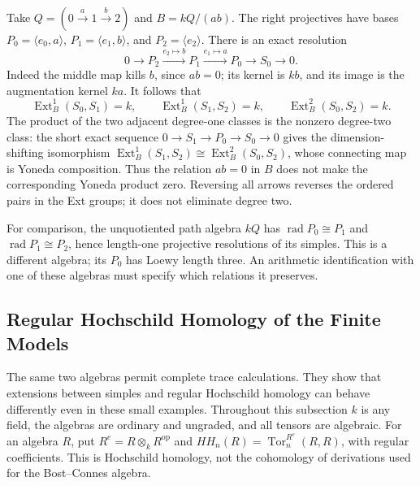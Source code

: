 \begin{example}
\label{v4-arith:wild:three-vertex}
Take \(Q=(0\xrightarrow{a}1\xrightarrow{b}2)\) and \(B=kQ/(ab)\).
The right projectives have bases
\(P_0=\langle e_0,a\rangle\), \(P_1=\langle e_1,b\rangle\),
and \(P_2=\langle e_2\rangle\). There is an exact resolution
\[
 0\longrightarrow P_2\xrightarrow{e_2\mapsto b}P_1
 \xrightarrow{e_1\mapsto a}P_0\longrightarrow S_0\longrightarrow0.
\]
Indeed the middle map kills \(b\), since \(ab=0\); its kernel is
\(kb\), and its image is the augmentation kernel \(ka\).
It follows that
\[
 \operatorname{Ext}^1_B(S_0,S_1)=k,\qquad
 \operatorname{Ext}^1_B(S_1,S_2)=k,\qquad
 \operatorname{Ext}^2_B(S_0,S_2)=k.
\]
The product of the two adjacent degree-one classes is the nonzero
degree-two class: the short exact sequence
\(0\to S_1\to P_0\to S_0\to0\) gives the dimension-shifting
isomorphism
\(\operatorname{Ext}^1_B(S_1,S_2)\cong\operatorname{Ext}^2_B(S_0,S_2)\),
whose connecting map is Yoneda composition.
Thus the relation \(ab=0\) in \(B\) does not make the corresponding
Yoneda product zero. Reversing all arrows reverses the ordered pairs
in the Ext groups; it does not eliminate degree two.

For comparison, the unquotiented path algebra \(kQ\) has
\(\operatorname{rad}P_0\cong P_1\) and
\(\operatorname{rad}P_1\cong P_2\), hence length-one projective
resolutions of its simples. This is a different algebra; its
\(P_0\) has Loewy length three. An arithmetic identification with
one of these algebras must specify which relations it preserves.
\end{example}

\subsection{Regular Hochschild Homology of the Finite Models}

The same two algebras permit complete trace calculations. They show
that extensions between simples and regular Hochschild homology
can behave differently even in these small examples. Throughout
this subsection \(k\) is any field, the algebras are ordinary and
ungraded, and all tensors are algebraic. For an algebra \(R\), put
\(R^e=R\otimes_k R^{\mathrm{op}}\) and
\(HH_n(R)=\operatorname{Tor}^{R^e}_n(R,R)\), with regular
coefficients. This is Hochschild homology, not the cohomology
of derivations used for the Bost--Connes algebra.

